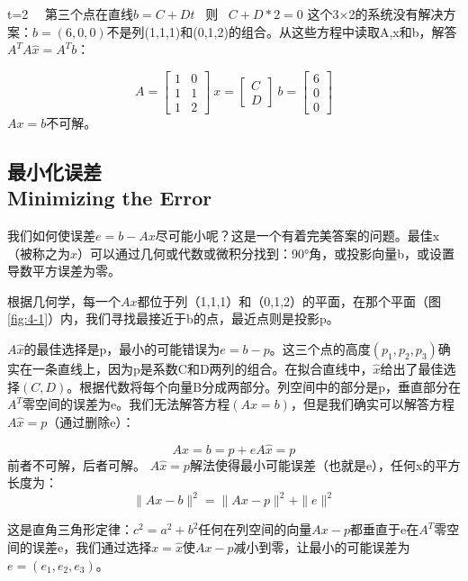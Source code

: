 	t=2   第三个点在直线$b=C+Dt$  则  $C+D*2=0$	
这个3×2的系统没有解决方案：$b =(6,0,0)$不是列(1,1,1)和(0,1,2)的组合。从这些方程中读取A,x和b，解答$A^TA\hat{x}=A^Tb$：

\begin{equation*}
  	A=              
\begin{bmatrix}
    1 & 0 \\ 1 & 1 \\ 1 & 2
\end{bmatrix}
  	\ x=
\begin{bmatrix}
	C \\ D
\end{bmatrix}
  	\ b=
\begin{bmatrix}
	6 \\ 0 \\0
\end{bmatrix}
\end{equation*}
$Ax=b$不可解。

	\subsection[最小化误差]{最小化误差\\Minimizing the Error}
	我们如何使误差$e=b-Ax$尽可能小呢？这是一个有着完美答案的问题。最佳x（被称之为$\hat{x}$）可以通过几何或代数或微积分找到：90°角，或投影向量b，或设置导数平方误差为零。
	
	根据几何学，每一个$Ax$都位于列（1,1,1）和（0,1,2）的平面，在那个平面（图\ref{fig:4-1}）内，我们寻找最接近于b的点，最近点则是投影p。
	
	$A\hat{x}$的最佳选择是p，最小的可能错误为$e=b-p$。这三个点的高度$(p_1,p_2,p_3)$确实在一条直线上，因为p是系数C和D两列的组合。在拟合直线中，$\hat{x}$给出了最佳选择$(C,D)$。根据代数将每个向量B分成两部分。列空间中的部分是p，垂直部分在$A^T$零空间的误差为e。我们无法解答方程$(Ax=b)$，但是我们确实可以解答方程$A\hat{x}=p$（通过删除e）：
	
	\begin{equation}
	Ax = b = p + e    A\hat{x} = p
	\end{equation}
	前者不可解，后者可解。
	$A\hat{x} = p$解法使得最小可能误差（也就是e），任何x的平方长度为：
	\begin{equation}
 	\|Ax-b\|^2 = \|Ax-p\|^2 + \|e\|^2
	\end{equation}
	
	这是直角三角形定律：$c^2=a^2+b^2$任何在列空间的向量$Ax-p$都垂直于e在$A^T$零空间的误差e，我们通过选择$x=\hat{x}$使$Ax-p$减小到零，让最小的可能误差为$e=(e_1,e_2,e_3)$。
	
